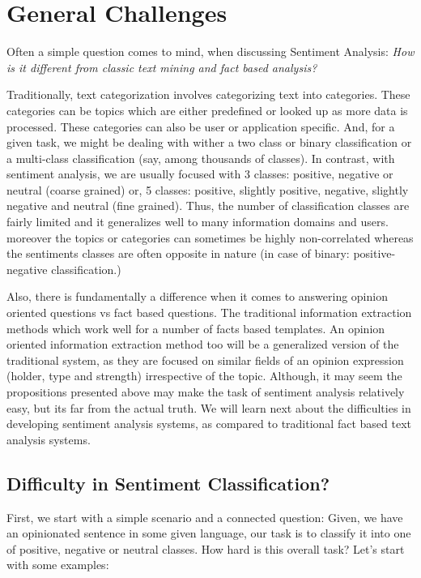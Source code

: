 \section{General Challenges}

Often a simple question comes to mind, when discussing Sentiment Analysis: \textit{How is it different from classic text mining and fact based analysis?}

Traditionally, text categorization involves categorizing text into categories. These categories can be topics which are either predefined or looked up as more data is processed. These categories can also be user or application specific. And, for a given task, we might be dealing with wither a two class or binary classification or a multi-class classification (say, among thousands of classes).   In contrast, with sentiment analysis, we are usually focused with 3 classes: positive, negative or neutral (coarse grained) or, 5 classes: positive, slightly positive, negative, slightly negative and neutral (fine grained).  Thus, the number of classification classes are fairly limited and it generalizes well to many information domains and users. moreover the topics or categories can sometimes be highly non-correlated whereas the sentiments classes are often opposite in nature (in case of binary: positive- negative classification.)

Also, there is fundamentally a difference when it comes to answering opinion oriented questions vs fact based questions. The traditional information extraction methods which work well for a number of facts based templates. An opinion oriented information extraction method too will be a generalized version of the traditional system, as they are focused on similar fields of an opinion expression (holder, type and strength) irrespective of the topic. Although, it may seem the propositions presented above may make the task of sentiment analysis relatively easy, but its far from the actual truth. We will learn next about the difficulties in developing sentiment analysis systems, as compared to traditional fact based text analysis systems.

\subsection{Difficulty in Sentiment Classification?}
First, we start with a simple scenario and a connected question: Given, we have an opinionated sentence in some given language, our task is to classify it into one of positive, negative or neutral classes. How hard is this overall task?
Let's start with some examples:

